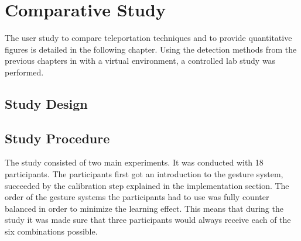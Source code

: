 \chapter{Comparative Study}
The user study to compare teleportation techniques and to provide quantitative figures is detailed in the following chapter. Using the detection methods from the previous chapters in with a virtual environment, a controlled lab study was performed. 

\section{}

\section{Study Design}






\section{Study Procedure}
The study consisted of two main experiments. It was conducted with 18 participants. The participants first got an introduction to the gesture system, succeeded by the calibration step explained in the implementation section. %
The order of the gesture systems the participants had to use was fully counter balanced in order to minimize the learning effect. This means that during the study it was made sure that three participants would always receive each of the six combinations possible. 

